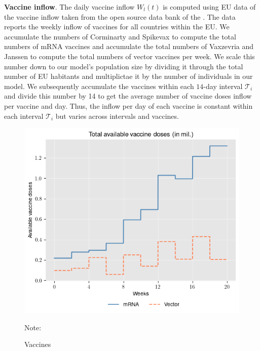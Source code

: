 \textbf{Vaccine inflow}. The daily vaccine inflow $W_l(t)$ is computed using EU data of the vaccine inflow taken from the open source data bank of the \cite{ECDC.2021}. The data reports the weekly inflow of vaccines for all countries within the EU. We accumulate the numbers of Corminarty and Spikevax to compute the total numbers of mRNA vaccines and accumulate the total numbers of Vaxzevria and Janssen to compute the total numbers of vector vaccines per week. We scale this number down to our model's population size by dividing it through the total number of EU habitants and multiplictae it by the number of individuals in our model. We subsequently accumulate the vaccines within each $14$-day interval $\mathcal{T}_i$ and divide this number by 14 to get the average number of vaccine doses inflow per vaccine and day. Thus, the inflow per day of each vaccine is constant within each interval $\mathcal{T}_i$ but varies across intervals and vaccines.
\begin{figure}[h!]
\centering
\includegraphics[scale=0.7]{images/available_vaccine.png}\\
\begin{flushleft}
\scriptsize{Note:}
\end{flushleft}
\caption{Vaccines}
\label{fig:available_vaccine}
\end{figure}

